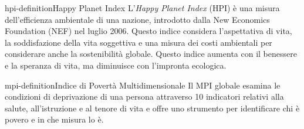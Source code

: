 \documentclass[preview]{standalone}
\begin{document}
\begin{snippetdefinition}{hpi-definition}{Happy Planet Index}
    L'\textit{Happy Planet Index} (HPI) è una misura dell'efficienza ambientale di una nazione,
    introdotto dalla New Economics Foundation
    (NEF) nel luglio 2006. Questo indice considera l'aspettativa di vita, la soddisfazione
    della vita soggettiva e una misura dei costi ambientali per considerare
    anche la sostenibilità globale.
    Questo indice aumenta con il benessere e la speranza di vita,
    ma diminuisce con l'impronta ecologica.
\end{snippetdefinition}


\begin{snippetdefinition}{mpi-definition}{Indice di Povertà Multidimensionale}
    Il MPI globale esamina le condizioni
    di deprivazione di una persona attraverso 10 indicatori relativi alla salute,
    all'istruzione e al tenore di vita e offre uno strumento per identificare chi è
    povero e in che misura lo è.
\end{snippetdefinition}
\end{document}

